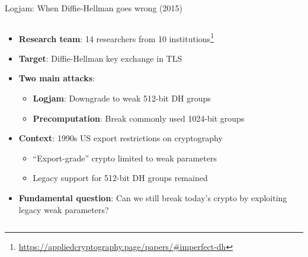 \documentclass[aspectratio=169, lualatex, handout]{beamer}
\begin{document}
\begin{frame}{Logjam: When Diffie-Hellman goes wrong (2015)}
	\begin{columns}[c]
		\begin{column}{1\textwidth}
			\begin{itemize}[<+->]
				\item \textbf{Research team}: 14 researchers from 10 institutions\footnote{\url{https://appliedcryptography.page/papers/\#imperfect-dh}}
				\item \textbf{Target}: Diffie-Hellman key exchange in TLS
				\item \textbf{Two main attacks}:
				      \begin{itemize}
					      \item \textbf{Logjam}: Downgrade to weak 512-bit DH groups
					      \item \textbf{Precomputation}: Break commonly used 1024-bit groups
				      \end{itemize}
				\item \textbf{Context}: 1990s US export restrictions on cryptography
				      \begin{itemize}
					      \item ``Export-grade'' crypto limited to weak parameters
					      \item Legacy support for 512-bit DH groups remained
				      \end{itemize}
				\item \textbf{Fundamental question}: Can we still break today's crypto by exploiting legacy weak parameters?
			\end{itemize}
		\end{column}
	\end{columns}
\end{frame}
\end{document}
